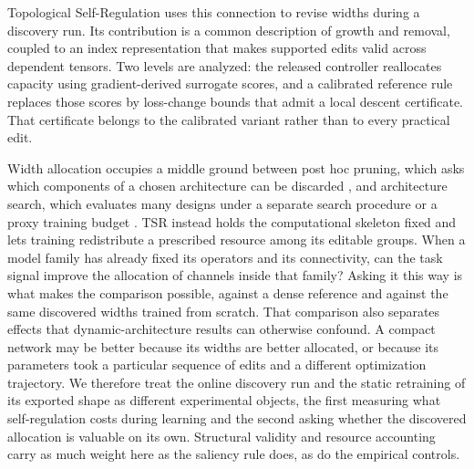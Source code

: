 \documentclass[10pt]{article}
\theoremstyle{paper}
\begin{document}
Topological Self-Regulation uses this connection to revise widths during a discovery run. Its contribution is a common description of growth and removal, coupled to an index representation that makes supported edits valid across dependent tensors. Two levels are analyzed: the released controller reallocates capacity using gradient-derived surrogate scores, and a calibrated reference rule replaces those scores by loss-change bounds that admit a local descent certificate. That certificate belongs to the calibrated variant rather than to every practical edit.

Width allocation occupies a middle ground between post hoc pruning, which asks which components of a chosen architecture can be discarded \citep{han2015learning,li2016pruning,he2017channel}, and architecture search, which evaluates many designs under a separate search procedure or a proxy training budget \citep{zoph2017neural,liu2018darts,JMLR:v20:18-598}. TSR instead holds the computational skeleton fixed and lets training redistribute a prescribed resource among its editable groups. When a model family has already fixed its operators and its connectivity, can the task signal improve the allocation of channels inside that family? Asking it this way is what makes the comparison possible, against a dense reference and against the same discovered widths trained from scratch. That comparison also separates effects that dynamic-architecture results can otherwise confound. A compact network may be better because its widths are better allocated, or because its parameters took a particular sequence of edits and a different optimization trajectory. We therefore treat the online discovery run and the static retraining of its exported shape as different experimental objects, the first measuring what self-regulation costs during learning and the second asking whether the discovered allocation is valuable on its own. Structural validity and resource accounting carry as much weight here as the saliency rule does, as do the empirical controls.
\end{document}
